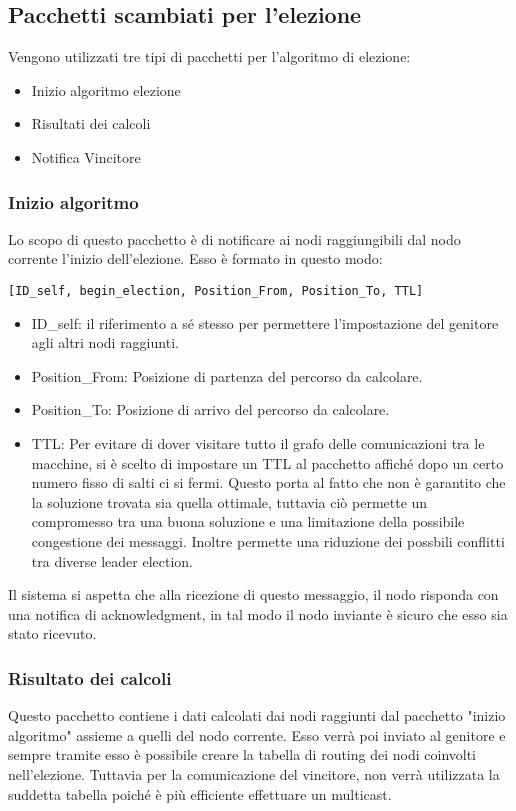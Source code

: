 \subsection{Pacchetti scambiati per l'elezione}\label{descrizione_pacchetto}
Vengono utilizzati tre tipi di pacchetti per l'algoritmo di elezione:
\begin{itemize}
	\item Inizio algoritmo elezione
	\item Risultati dei calcoli
	\item Notifica Vincitore
\end{itemize}

\subsubsection{Inizio algoritmo}
Lo scopo di questo pacchetto è di notificare ai nodi raggiungibili dal nodo corrente l'inizio dell'elezione. Esso è formato in questo modo:

\begin{lstlisting}
[ID_self, begin_election, Position_From, Position_To, TTL]
\end{lstlisting}

\begin{itemize}
	\item ID\_self: il riferimento a sé stesso per permettere l'impostazione del genitore agli altri nodi raggiunti.
	\item Position\_From: Posizione di partenza del percorso da calcolare.
	\item Position\_To: Posizione di arrivo del percorso da calcolare.
	\item TTL: Per evitare di dover visitare tutto il grafo delle comunicazioni tra le macchine, si è scelto di impostare un TTL al pacchetto affiché dopo un certo numero fisso di salti ci si fermi. Questo porta al fatto che non è garantito che la soluzione trovata sia quella ottimale, tuttavia ciò permette un compromesso tra una buona soluzione e una limitazione della possibile congestione dei messaggi. Inoltre permette una riduzione dei possbili conflitti tra diverse leader election.
\end{itemize}

Il sistema si aspetta che alla ricezione di questo messaggio, il nodo risponda con una notifica di acknowledgment, in tal modo il nodo inviante è sicuro che esso sia stato ricevuto.

\subsubsection{Risultato dei calcoli} \label{pacchetto_calcolato}
Questo pacchetto contiene i dati calcolati dai nodi raggiunti dal pacchetto "inizio algoritmo" assieme a quelli del nodo corrente. Esso verrà poi inviato al genitore e sempre tramite esso è possibile creare la tabella di routing dei nodi coinvolti nell'elezione. Tuttavia per la comunicazione del vincitore, non verrà utilizzata la suddetta tabella poiché è più efficiente effettuare un multicast.

